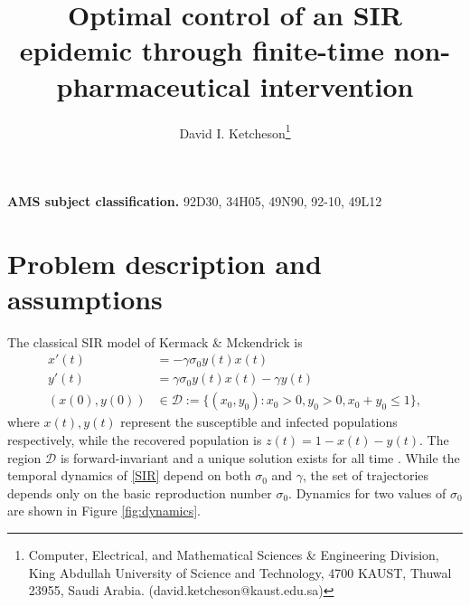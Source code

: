 \documentclass[english,12pt,letter]{article}
\newcommand{\Rnot}{\sigma_0}
\newcommand{\dom}{{\mathcal D}}
\newenvironment{AMS}{\par\textbf{AMS subject classification.}}{\par}
\begin{document}
\title{Optimal control of an SIR epidemic through finite-time non-pharmaceutical intervention}
\author{
  David I. Ketcheson\thanks{Computer, Electrical, and Mathematical Sciences \& Engineering Division,
King Abdullah University of Science and Technology, 4700 KAUST, Thuwal
23955, Saudi Arabia. (david.ketcheson@kaust.edu.sa)}
}
\maketitle


\begin{AMS}
    92D30, 34H05, 49N90, 92-10, 49L12
\end{AMS}


\section{Problem description and assumptions}
The classical SIR model of Kermack \& Mckendrick \cite{kermack1927contribution} is
\begin{subequations} \label{SIR}
\begin{align} 
    x'(t) & = -\gamma \Rnot y(t) x(t) \label{eq:x} \\
    y'(t) & = \gamma \Rnot y(t) x(t) - \gamma y(t) \label{eq:y} \\
    (x(0),y(0)) & \in \dom := \{(x_0,y_0) : x_0 > 0, y_0 > 0, x_0+y_0 \le 1\},
\end{align}
\end{subequations}
where $x(t), y(t)$ represent the susceptible and infected populations
respectively, while the recovered population is $z(t)=1-x(t)-y(t)$.  The region
$\dom$ is forward-invariant and a unique solution exists for all time
\cite{hethcote2000mathematics}.  While
the temporal dynamics of \eqref{SIR} depend on both $\Rnot$ and $\gamma$, the set
of trajectories depends only on the basic reproduction number 
$\Rnot$.  Dynamics for two values of $\Rnot$ are
shown in Figure \ref{fig:dynamics}.  
\end{document}

